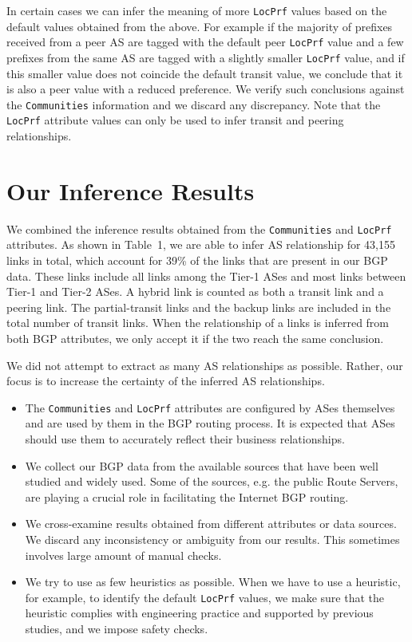 \documentclass[conference]{IEEEtran}
\begin{document}
In certain cases we can infer the meaning of more  {\tt LocPrf} values based on the default values obtained from the above. For example 
if the majority of prefixes received from a peer AS are tagged with the default peer {\tt LocPrf} value and a few prefixes from the same AS are tagged with a slightly smaller {\tt LocPrf} value, and if this smaller value does not coincide the default transit value, we  conclude that it is also a peer value with a reduced preference. We verify such conclusions against the  {\tt Communities} information and we discard any discrepancy.
Note that the {\tt LocPrf} attribute values can only be used to infer transit and peering relationships.

\section{Our Inference Results}

We combined the inference results obtained from the  {\tt Communities}  and {\tt LocPrf} attributes. As shown in Table~1, we are able to infer  AS relationship for 43,155 links in total, which account for 39\% of the links that are present in our BGP data. These links include all links among the Tier-1 ASes and most links between Tier-1 and Tier-2 ASes.  A hybrid link is counted as both a transit link and a peering link. The partial-transit links and the backup links are included in the total number of transit links. When the relationship of a links is inferred from both BGP attributes, we only accept it if the two reach the same conclusion.

We did not attempt to extract as many AS relationships as possible. 
Rather, our focus is to increase the certainty of the inferred AS relationships. 

\begin{itemize}

\item The  {\tt Communities} and {\tt LocPrf} attributes are configured  by ASes themselves and are  used by them in the BGP routing process. It is expected that ASes should  use them to accurately reflect their business relationships.

\item We collect our BGP  data from the  available sources that have been well studied and widely used. Some of the sources, e.g. the public Route Servers, are playing a crucial role in facilitating the Internet BGP routing.

\item We cross-examine results obtained from different attributes or data sources.  We discard any inconsistency or ambiguity from our results. This sometimes involves large amount of  manual checks.

\item We try to use as few heuristics as possible. When we have to use a heuristic, for example, to identify the default {\tt LocPrf} values, we make sure that the heuristic complies with engineering practice and  supported by previous studies, and we impose  safety checks.

\end{itemize}
\end{document}
